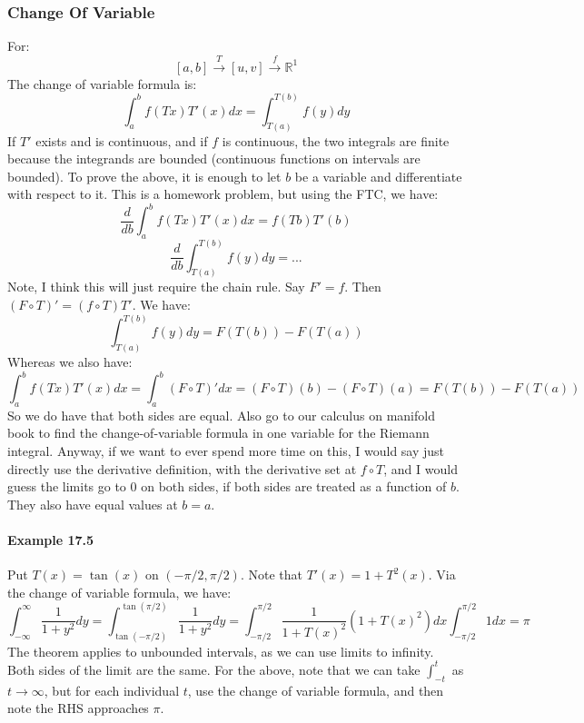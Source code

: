 \documentclass[12pt,a4paper]{article}
\newcommand{\1}[1]{\mathbbm{1}\left\{ #1 \right\}}
\newcommand{\R}{\mathbb{R}}
\begin{document}
\subsubsection{Change Of Variable} For:
$$
	[a,b] \overset{T}{\to} [u,v] \overset{f}{\to} \R^1
$$
The change of variable formula is:
$$
	\int_a^b f(Tx) T'(x) dx =
	\int_{T(a)}^{T(b)} f(y) dy
$$
If $T'$ exists and is continuous, and if $f$ is continuous, the two integrals are finite because the integrands are bounded (continuous functions on intervals are bounded). To prove the above, it is enough to let $b$ be a variable and differentiate with respect to it. This is a homework problem, but using the FTC, we have:
$$
	\frac{d}{db} \int_a^b f(Tx) T'(x) dx = f(Tb)T'(b)
$$
$$
	\frac{d}{db} \int_{T(a)}^{T(b)} f(y) dy = ...
$$
Note, I think this will just require the chain rule. Say $F' = f$. Then $(F \circ T)' = (f \circ T)T'$. We have:
$$
	\int_{T(a)}^{T(b)} f(y) dy = F(T(b)) - F(T(a))
$$
Whereas we also have:
$$
	\int_a^b f(Tx) T'(x) dx = \int_a^b (F \circ T)' dx = (F \circ T)(b) - (F \circ T)(a) = F(T(b)) - F(T(a))
$$
So we do have that both sides are equal. Also go to our calculus on manifold book to find the change-of-variable formula in one variable for the Riemann integral. Anyway, if we want to ever spend more time on this, I would say just directly use the derivative definition, with the derivative set at $f \circ T$, and I would guess the limits go to 0 on both sides, if both sides are treated as a function of $b$. They also have equal values at $b = a$.

\paragraph{Example 17.5} Put $T(x) = \tan(x)$ on $(-\pi/2,\pi/2)$. Note that $T'(x) = 1 + T^2(x)$. Via the change of variable formula, we have:
$$
	\int_{-\infty}^\infty \frac{1}{1 + y^2} dy =
	\int_{\tan(-\pi/2)}^{\tan(\pi/2)} \frac{1}{1 + y^2} dy =
	\int_{-\pi/2}^{\pi/2} \frac{1}{1 + T(x)^2} (1 + T(x)^2) dx
	\int_{-\pi/2}^{\pi/2} 1dx = \pi
$$
The theorem applies to unbounded intervals, as we can use limits to infinity. Both sides of the limit are the same. For the above, note that we can take $\int_{-t}^{t}$ as $t \to \infty$, but for each individual $t$, use the change of variable formula, and then note the RHS approaches $\pi$.
\end{document}
